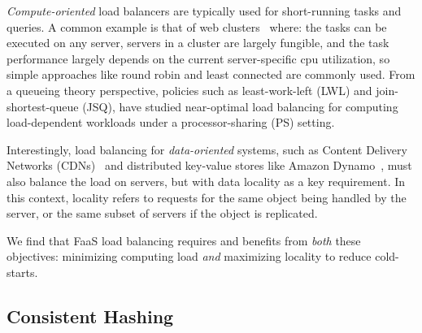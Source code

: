 \emph{Compute-oriented} load balancers are typically used for short-running tasks and queries. 
A common example is that of web clusters~\cite{karger1999web} where: the tasks can be executed on any server,  servers in a cluster are largely fungible, and the task performance largely depends on the current server-specific cpu utilization, so simple approaches like round robin and least connected are commonly used.
From a queueing theory perspective, policies such as least-work-left (LWL) and join-shortest-queue (JSQ), have studied near-optimal load balancing for computing load-dependent workloads under a processor-sharing (PS) setting. 

Interestingly, load balancing for \emph{data-oriented} systems, such as Content Delivery Networks (CDNs)~\cite{nygren2010akamai} and distributed key-value stores like Amazon Dynamo~\cite{decandia2007dynamo}, must also balance the load on servers, but with data locality as a key requirement.
In this context, locality refers to requests for the same object being handled by the server, or the same subset of servers if the object is replicated. 

We find that FaaS load balancing requires and benefits from \emph{both} these objectives: minimizing computing load \emph{and} maximizing locality to reduce cold-starts. 

\subsection{Consistent Hashing} 
\label{subsec:ch}

